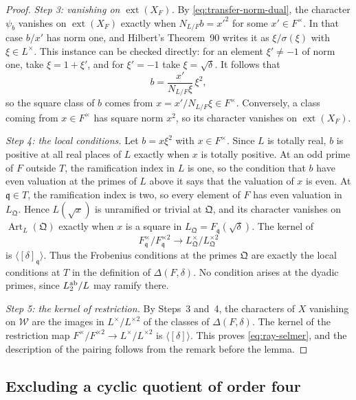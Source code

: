 \documentclass[11pt]{article}
\theoremstyle{plain}
\theoremstyle{definition}
\theoremstyle{remark}
\begin{document}
\begin{proof}
\emph{Step 3: vanishing on $\operatorname{ext}(X_F)$.}  By
\eqref{eq:transfer-norm-dual}, the character $\psi_b$ vanishes on
$\operatorname{ext}(X_F)$ exactly when $N_{L/F}b=x'^2$ for some
$x'\in F^\times$.  In that case $b/x'$ has norm one, and Hilbert's
Theorem~90 writes it as $\xi/\sigma(\xi)$ with $\xi\in L^\times$.  This
instance can be checked directly: for an element $\xi'\ne-1$ of norm
one, take $\xi=1+\xi'$, and for $\xi'=-1$ take $\xi=\sqrt\delta$.  It
follows that
\[
 b=\frac{x'}{N_{L/F}\xi}\,\xi^2,
\]
so the square class of $b$ comes from $x=x'/N_{L/F}\xi\in F^\times$.
Conversely, a class coming from $x\in F^\times$ has square norm $x^2$, so
its character vanishes on $\operatorname{ext}(X_F)$.

\emph{Step 4: the local conditions.}  Let $b=x\xi^2$ with
$x\in F^\times$.  Since $L$ is totally real, $b$ is positive at all real
places of $L$ exactly when $x$ is totally positive.  At an odd prime of
$F$ outside $T$, the ramification index in $L$ is one, so the condition
that $b$ have even valuation at the primes of $L$ above it says that the
valuation of $x$ is even.  At $\mathfrak q\in T$, the ramification index
is two, so every element of $F$ has even valuation in $L_{\mathfrak Q}$.
Hence $L(\sqrt x)$ is unramified or trivial at $\mathfrak Q$, and its
character vanishes on $\operatorname{Art}_L(\mathfrak Q)$ exactly when
$x$ is a square in $L_{\mathfrak Q}=F_{\mathfrak q}(\sqrt\delta)$.  The
kernel of
\[
 F_{\mathfrak q}^\times/F_{\mathfrak q}^{\times2}
 \longrightarrow L_{\mathfrak Q}^\times/L_{\mathfrak Q}^{\times2}
\]
is $\langle[\delta]_{\mathfrak q}\rangle$.  Thus the Frobenius conditions
at the primes $\mathfrak Q$ are exactly the local conditions at $T$ in
the definition of $\Delta(F,\delta)$.  No condition arises at the dyadic
primes, since $L^{\rm ab}_2/L$ may ramify there.

\emph{Step 5: the kernel of restriction.}  By Steps~3 and~4, the
characters of $X$ vanishing on $\mathcal W$ are the images in
$L^\times/L^{\times2}$ of the classes of $\Delta(F,\delta)$.  The kernel
of the restriction map $F^\times/F^{\times2}\to L^\times/L^{\times2}$ is
$\langle[\delta]\rangle$.  This proves \eqref{eq:ray-selmer}, and the
description of the pairing follows from the remark before the lemma.
\end{proof}

\subsection{Excluding a cyclic quotient of order four}\label{sec:dyadic-dihedral}
\end{document}
